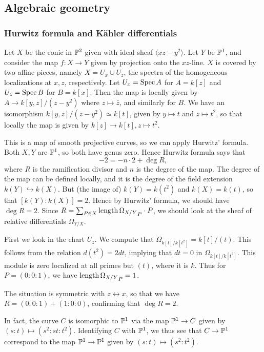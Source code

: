 \documentclass[11pt, english]{article}
\begin{document}
\subsection{Algebraic geometry}

\subsubsection{Hurwitz formula and Kähler differentials}
\label{exhurwitz}

Let $X$ be the conic in $\mathbb{P}^2$ given with ideal sheaf $\langle xz-y^2 \rangle$. Let $Y$ be $\mathbb{P}^1$, and consider the map $f:X \to Y$ given by projection onto the $xz$-line. $X$ is covered by two affine pieces, namely $X= U_x \cup U_z$, the spectra of the homogeneous localizations at $x,z$, respectively. Let $U_x=\operatorname{Spec} A$ for $A=k[z]$ and $U_z = \operatorname{Spec} B$ for $B=k[x]$. Then the map is locally given by $A \to k[y,z]/(z-y^2)$ where $z \mapsto \bar z$, and similarly for $B$. We have an isomorphism $k[y,z]/(z-y^2) \simeq k[t]$, given by $y \mapsto t$ and $z \mapsto t^2$, so that locally the map is given by $k[z] \to k[t], z \mapsto t^2$.

This is a map of smooth projective curves, so we can apply Hurwitz' formula. Both $X,Y$ are $\mathbb{P}^1$, so both have genus zero. Hence Hurwitz formula says that
\[
-2 = -n \cdot 2+ \deg R,
\]
where $R$ is the ramification divisor and $n$ is the degree of the map. The degree of the map can be defined locally, and it is the degree of the field extension $k(Y) \hookrightarrow k(X)$. But (the image of) $k(Y) = k(t^2)$ and $k(X)=k(t)$, so that $[k(Y):k(X)]=2$. Hence by Hurwitz' formula, we should have $\deg R = 2$. Since $R = \sum_{P \in X} \mathrm{length} \, {\Omega_{X/Y}}_P \cdot P$, we should look at the sheaf of relative differentials $\Omega_{Y/X}$.

First we look in the chart $U_z$. We compute that $\Omega_{k[t]/k[t^2]} = k[t]/(t)$. This follows from the relation $d(t^2)=2dt$, implying that $dt=0$ in $\Omega_{k[t]/k[t^2]}$. This module is zero localized at all primes but $(t)$, where it is $k$. Thus for $P=(0:0:1)$, we have $\mathrm{length} \, {\Omega_{X/Y}}_P = 1$.

The situation is symmetric with $z \leftrightarrow x$, so that we have $R = (0:0:1) + (1:0:0)$, confirming that $\deg R=2$. 

In fact, the curve $C$ is isomorphic to $\mathbb{P}^1$ via the map $\mathbb{P}^1 \to C$ given by $(s:t) \mapsto (s^2:st:t^2)$. Identifying $C$ with $\mathbb{P}^1$, we thus see that $C \to \mathbb{P}^1$ correspond to the map $\mathbb{P}^1 \to \mathbb{P}^1$ given by $(s:t) \mapsto (s^2:t^2)$. 
\end{document}
